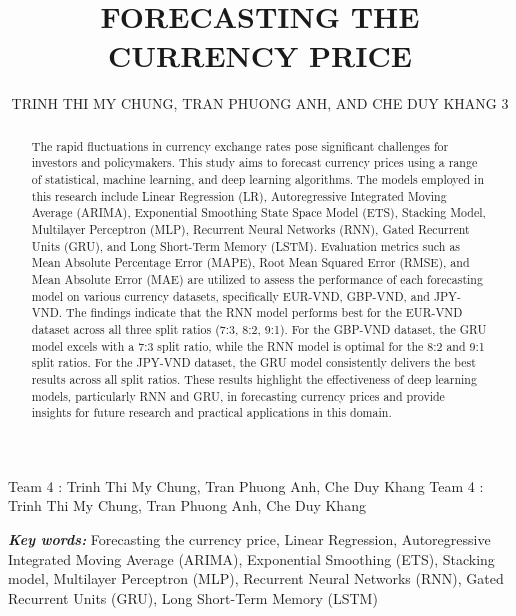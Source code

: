 \documentclass{ieeeojies}
\begin{document}
\title{FORECASTING THE CURRENCY PRICE}

\author{\uppercase{Trinh Thi My Chung},
\uppercase{Tran Phuong Anh, and Che Duy Khang 3}}

\address[1]{Faculty of Information Systems, University of Information Technology, (e-mail: 21520653@gm.uit.edu.vn)}
\address[2]{Faculty of Information Systems, University of Information Technology, (e-mail: 21520595@gm.uit.edu.vn)}
\address[3]{Faculty of Information Systems, University of Information Technology, (e-mail: 21522187@gm.uit.edu.vn)}

\markboth
{Team 4 \headeretal: Trinh Thi My Chung, Tran Phuong Anh, Che Duy Khang}
{Team 4 \headeretal: Trinh Thi My Chung, Tran Phuong Anh, Che Duy Khang}

\begin{abstract}

The rapid fluctuations in currency exchange rates pose significant challenges for investors and policymakers. This study aims to forecast currency prices using a range of statistical, machine learning, and deep learning algorithms. The models employed in this research include Linear Regression (LR), Autoregressive Integrated Moving Average (ARIMA), Exponential Smoothing State Space Model (ETS), Stacking Model, Multilayer Perceptron (MLP), Recurrent Neural Networks (RNN), Gated Recurrent Units (GRU), and Long Short-Term Memory (LSTM). Evaluation metrics such as Mean Absolute Percentage Error (MAPE), Root Mean Squared Error (RMSE), and Mean Absolute Error (MAE) are utilized to assess the performance of each forecasting model on various currency datasets, specifically EUR-VND, GBP-VND, and JPY-VND. The findings indicate that the RNN model performs best for the EUR-VND dataset across all three split ratios (7:3, 8:2, 9:1). For the GBP-VND dataset, the GRU model excels with a 7:3 split ratio, while the RNN model is optimal for the 8:2 and 9:1 split ratios. For the JPY-VND dataset, the GRU model consistently delivers the best results across all split ratios. These results highlight the effectiveness of deep learning models, particularly RNN and GRU, in forecasting currency prices and provide insights for future research and practical applications in this domain.
\end{abstract}

\begin{keywords}

\textit{\textbf{Key words:}} Forecasting the currency price, Linear Regression, Autoregressive Integrated Moving Average (ARIMA), Exponential Smoothing (ETS), Stacking model, Multilayer Perceptron (MLP), Recurrent Neural Networks (RNN), Gated Recurrent Units (GRU), Long Short-Term Memory (LSTM)
\end{keywords}
\end{document}
